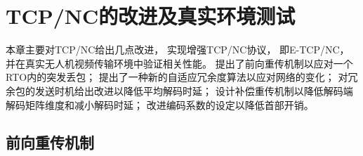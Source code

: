 \chapter{TCP/NC的改进及真实环境测试}
本章主要对TCP/NC给出几点改进，
实现增强TCP/NC协议，
即E-TCP/NC，
并在真实无人机视频传输环境中验证相关性能。
提出了前向重传机制以应对一个RTO内的突发丢包；
提出了一种新的自适应冗余度算法以应对网络的变化；
对冗余包的发送时机给出改进以降低平均解码时延；
设计补偿重传机制以降低解码端解码矩阵维度和减小解码时延；
改进编码系数的设定以降低首部开销。
\section{前向重传机制}
